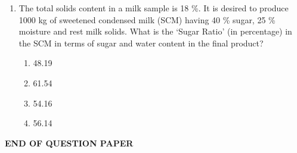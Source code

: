 \documentclass[journal,12pt,onecolumn]{IEEEtran}
\begin{document}
\begin{enumerate}[label=\arabic*.]
\item The total solids content in a milk sample is 18 \%. It is desired to produce 1000 kg of sweetened condensed milk (SCM) having 40 \% sugar, 25 \% moisture and rest milk solids. What is the ‘Sugar Ratio’ (in percentage) in the SCM in terms of sugar and water content in the final product?
\begin{multicols}{4}
\begin{enumerate}[label=(\Alph*)]
\item 48.19
\item 61.54
\item 54.16
\item 56.14
\end{enumerate}
\end{multicols}

\end{enumerate}

\begin{center}
\textbf{END OF QUESTION PAPER}
\end{center}
\end{document}
